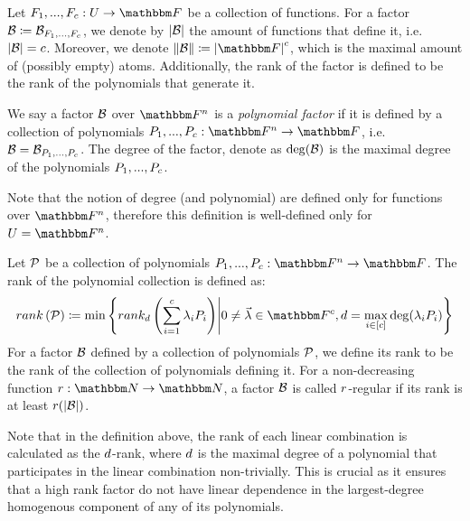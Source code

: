 \begin{notation*}
    Let $\funcdef{\genfunc_1,...,\genfunc_c}{U}{\basefield}$ be a collection of functions.
    For a factor $\factor \definedas \factor_{\genfunc_1,...,\genfunc_c}$, we denote by $\left| \mathcal{B} \right|$ the amount of functions that define it, i.e. $\left| \mathcal{B} \right| = c$.
    Moreover, we denote $\norm{\factor} \definedas \abs{\basefield}^c$, which is the maximal amount of (possibly empty) atoms.
    Additionally, the rank of the factor is defined to be the rank of the polynomials that generate it.
\end{notation*}
\begin{definition}
    We say a factor $\mathcal{B}$ over $\field$ is a \emph{polynomial factor} if it is defined by a collection of polynomials $\funcdef{\genpoly_1,...,\genpoly_c}{\field}{\basefield}$,
    i.e. $\factor = \factor_{\genpoly_1,...,\genpoly_c}$.
    The degree of the factor, denote as $\deg(\mathcal{B})$ is the maximal degree of the polynomials $\genpoly_1,...,\genpoly_c$.
\end{definition}
Note that the notion of degree (and polynomial) are defined only for functions over $\field$,
therefore this definition is well-defined only for $U = \field$.

\begin{definition}\label{definition:factor-rank}
    Let $\genpolyset$ be a collection of polynomials $\funcdef{\genpoly_1,...,\genpoly_c}{\field}{\basefield}$.
    The rank of the polynomial collection is defined as:
    \[
        \rank{\genpolyset} \definedas \min \set{\drank{\degree}{\sum_{i=1}^c{\lambda_i \genpoly_i}} \suchthat 0 \neq \vec{\lambda} \in \basefield^c, \degree = \max_{i\in\sparens{c}}{\deg(\lambda_i \genpoly_i)}}
    \]
    For a factor $\mathcal{B}$ defined by a collection of polynomials $\genpolyset$, we define its rank to be the rank of the collection of polynomials defining it.
    For a non-decreasing function $\funcdef{\rankfunc}{\naturalnumbersset}{\naturalnumbersset}$, a factor $\mathcal{B}$ is called ${{{r}}}$-regular if its rank is at least ${{{r}}}(\left| \mathcal{B} \right|)$.
\end{definition}
\begin{note*}
    Note that in the definition above, the rank of each linear combination is calculated as the $d$-rank,
    where $d$ is the maximal degree of a polynomial that participates in the linear combination non-trivially.
    This is crucial as it ensures that a high rank factor do not have linear dependence in the largest-degree homogenous component of any of its polynomials.
\end{note*}


